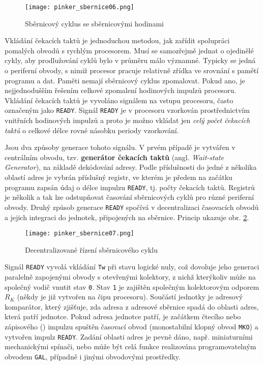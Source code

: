       \begin{figure}[ht!] %
        \centering
        \texttt{[image: pinker\_sbernice06.png]}
        \caption{Sběrnicový cyklus se sběrnicovými hodinami}
        \label{MIT:fig_sbernice06}
      \end{figure}
    
      Vkládání čekacích taktů je jednoduchou metodou, jak zařídit spolupráci pomalých obvodů s 
      rychlým procesorem. Musí se samozřejmě jednat o ojedinělé cykly, aby prodlužování cyklů bylo 
      v průměru málo významné. Typicky se jedná o periferní obvody, s nimiž procesor pracuje 
      relativně zřídka ve srovnání s pamětí programu a dat. Paměti nemají sběrnicový cyklus 
      zpomalovat. Pokud ano, je nejjednodušším řešením celkové zpomalení hodinových impulzů 
      procesoru. Vkládání čekacích taktů je vyvoláno signálem na vstupu procesoru, často označeným 
      jako \texttt{READY}. Signál \texttt{READY} je v procesoru vzorkován prostřednictvím vnitřních 
      hodinových impulzů a proto je možno vkládat jen \emph{celý počet čekacích taktů} o celkové 
      délce rovné násobku periody vzorkování.
      
      Jsou dva způsoby generace tohoto signálu. V prvém případě je vytvářen v centrálním obvodu, 
      tzv. \textbf{generátor čekacích taktů} (angl. \emph{Wait-state Generator}), na základě 
      dekódování adresy. Podle příslušnosti do jedné z několika oblastí adres je vybrán příslušný 
      registr, ve kterém je předem na začátku programu zapsán údaj o délce impulzu \texttt{READY}, 
      tj. počty čekacích taktů. Registrů je několik a tak lze odstupňovat časování sběrnicových 
      cyklů pro různé periferní obvody. Druhý způsob generace \texttt{READY} spočívá v 
      decentralizaci časovacích obvodů a jejich integraci do jednotek, připojených na sběrnice. 
      Princip ukazuje obr. \ref{MIT:fig_sbernice07}.
      
      \begin{figure}[ht!] %
        \centering
        \texttt{[image: pinker\_sbernice07.png]}
        \caption{Decentralizované řízení sběrnicového cyklu}
        \label{MIT:fig_sbernice07}
      \end{figure}
      
      Signál \texttt{READY} vyvolá vkládání \texttt{Tw} při stavu logické nuly, což dovoluje jeho 
      generaci paralelně zapojenými obvody s otevřenými kolektory, z nichž kterýkoliv může na 
      společný vodič vnutit stav \texttt{0}. Stav \texttt{1} je zajištěn společným kolektorovým 
      odporem \(R_K\) (někdy je již vytvořen na čipu procesoru). Součástí jednotky je adresový 
      komparátor, který zjišťuje, zda adresa z adresové sběrnice spadá do oblasti adres, která 
      patří jednotce. Pokud adresa jednotce patří, je začátkem čtecího nebo zápisového 
      () impulzu spuštěn časovací obvod  (monostabilní klopný obvod 
      \texttt{MKO}) a vytvořen impulz \texttt{READY}. Zadání oblasti adres je pevně dáno, např. 
      miniaturními mechanickými spínači, nebo může být celá funkce realizována programovatelným 
      obvodem \texttt{GAL}, případně i jinými obvodovými prostředky.
      
